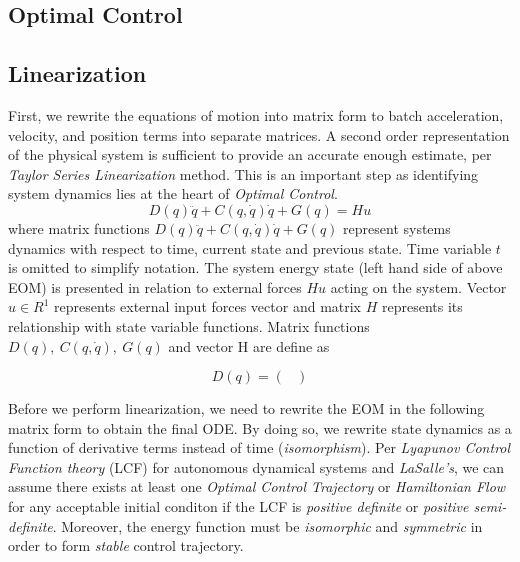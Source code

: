 \documentclass[journal]{IEEEtran}
\begin{document}
\subsection{Optimal Control}

\subsection{Linearization}
First, we rewrite the equations of motion into matrix form to batch acceleration,
velocity, and position terms into separate matrices. A second order representation
of the physical system is sufficient to provide an accurate enough estimate,
per \emph{Taylor Series Linearization} method. This is an important step as
identifying system dynamics lies at the heart of \emph{Optimal Control}.
\begin{equation}
D(q) \ddot{q} + C(q, \dot{q}) \dot{q} + G(q) = Hu
\end{equation}
where matrix functions \(D(q) \ddot{q} + C(q, \dot{q}) \dot{q} + G(q)\)
represent systems dynamics with respect to time,
current state and previous state. Time variable \(t\) is omitted to simplify
notation. The system energy state (left hand side of
above EOM) is presented in relation to external forces \(Hu\) acting on the
system. Vector \(u \in R^1\) represents external input forces vector and matrix
\(H\) represents its relationship with state variable functions. Matrix
functions \(D(q),~C(q, \dot{q}),~G(q)\) and vector H are define as

\begin{equation}
    D(q) = \begin{pmatrix}

    \end{pmatrix}
\end{equation}


Before we perform linearization, we need to rewrite the EOM in the following
matrix form to obtain the final ODE. By doing so, we rewrite state dynamics as
a function of derivative terms instead of time (\emph{isomorphism}). Per \emph{Lyapunov
Control Function theory} (LCF) for autonomous dynamical systems and
\emph{LaSalle's}, we can assume there exists at least one
\emph{Optimal Control Trajectory} or \emph{Hamiltonian Flow} for any acceptable
initial conditon if the LCF is \emph{positive definite} or \emph{positive
semi-definite}. Moreover, the energy function must be \emph{isomorphic} and
\emph{symmetric} in order to form \emph{stable} control trajectory.
\end{document}
